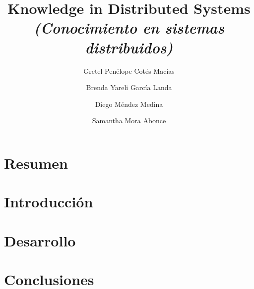 \documentclass{article}
\title{Knowledge in Distributed Systems\\
  \textit{(Conocimiento en sistemas distribuidos)}}
\author{Gretel Penélope Cotés Macías \and Brenda Yareli García Landa
  \and Diego Méndez Medina \and Samantha Mora Abonce}
\date{}
\begin{document}
\maketitle


\begin{multicols}{2}
\section{Resumen}

\section{Introducción}

\section{Desarrollo}

\section{Conclusiones}

\end{multicols}
\end{document}

